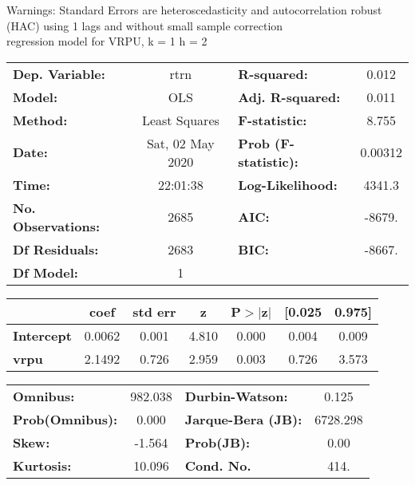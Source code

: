 Warnings: \newline
 [1] Standard Errors are heteroscedasticity and autocorrelation robust (HAC) using 1 lags and without small sample correction\\ 

regression model for VRPU, k = 1 h = 2\begin{center}
\begin{tabular}{lclc}
\toprule
\textbf{Dep. Variable:}    &       rtrn       & \textbf{  R-squared:         } &     0.012   \\
\textbf{Model:}            &       OLS        & \textbf{  Adj. R-squared:    } &     0.011   \\
\textbf{Method:}           &  Least Squares   & \textbf{  F-statistic:       } &     8.755   \\
\textbf{Date:}             & Sat, 02 May 2020 & \textbf{  Prob (F-statistic):} &  0.00312    \\
\textbf{Time:}             &     22:01:38     & \textbf{  Log-Likelihood:    } &    4341.3   \\
\textbf{No. Observations:} &        2685      & \textbf{  AIC:               } &    -8679.   \\
\textbf{Df Residuals:}     &        2683      & \textbf{  BIC:               } &    -8667.   \\
\textbf{Df Model:}         &           1      & \textbf{                     } &             \\
\bottomrule
\end{tabular}
\begin{tabular}{lcccccc}
                   & \textbf{coef} & \textbf{std err} & \textbf{z} & \textbf{P$> |$z$|$} & \textbf{[0.025} & \textbf{0.975]}  \\
\midrule
\textbf{Intercept} &       0.0062  &        0.001     &     4.810  &         0.000        &        0.004    &        0.009     \\
\textbf{vrpu}      &       2.1492  &        0.726     &     2.959  &         0.003        &        0.726    &        3.573     \\
\bottomrule
\end{tabular}
\begin{tabular}{lclc}
\textbf{Omnibus:}       & 982.038 & \textbf{  Durbin-Watson:     } &    0.125  \\
\textbf{Prob(Omnibus):} &   0.000 & \textbf{  Jarque-Bera (JB):  } & 6728.298  \\
\textbf{Skew:}          &  -1.564 & \textbf{  Prob(JB):          } &     0.00  \\
\textbf{Kurtosis:}      &  10.096 & \textbf{  Cond. No.          } &     414.  \\
\bottomrule
\end{tabular}
\end{center}

